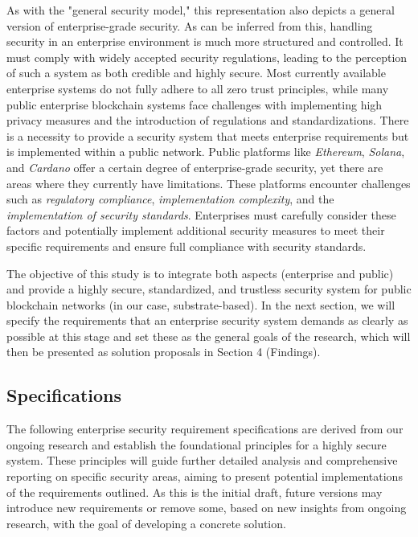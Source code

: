 As with the "general security model," this representation also depicts a general version of enterprise-grade security. As can be inferred from this, handling security in an enterprise environment is much more structured and controlled. It must comply with widely accepted security regulations, leading to the perception of such a system as both credible and highly secure.
Most currently available enterprise systems do not fully adhere to all zero trust principles, while many public enterprise blockchain systems face challenges with implementing high privacy measures and the introduction of regulations and standardizations. There is a necessity to provide a security system that meets enterprise requirements but is implemented within a public network. Public platforms like \textit{Ethereum}, \textit{Solana}, and \textit{Cardano} offer a certain degree of enterprise-grade security, yet there are areas where they currently have limitations. These platforms encounter challenges such as \textit{regulatory compliance}, \textit{implementation complexity}, and the \textit{implementation of security standards}. Enterprises must carefully consider these factors and potentially implement additional security measures to meet their specific requirements and ensure full compliance with security standards.

The objective of this study is to integrate both aspects (enterprise and public) and provide a highly secure, standardized, and trustless security system for public blockchain networks (in our case, substrate-based). In the next section, we will specify the requirements that an enterprise security system demands as clearly as possible at this stage and set these as the general goals of the research, which will then be presented as solution proposals in Section 4 (Findings).

\subsection{Specifications}
The following enterprise security requirement specifications are derived from our ongoing research and establish the foundational principles for a highly secure system. These principles will guide further detailed analysis and comprehensive reporting on specific security areas, aiming to present potential implementations of the requirements outlined. As this is the initial draft, future versions may introduce new requirements or remove some, based on new insights from ongoing research, with the goal of developing a concrete solution.

